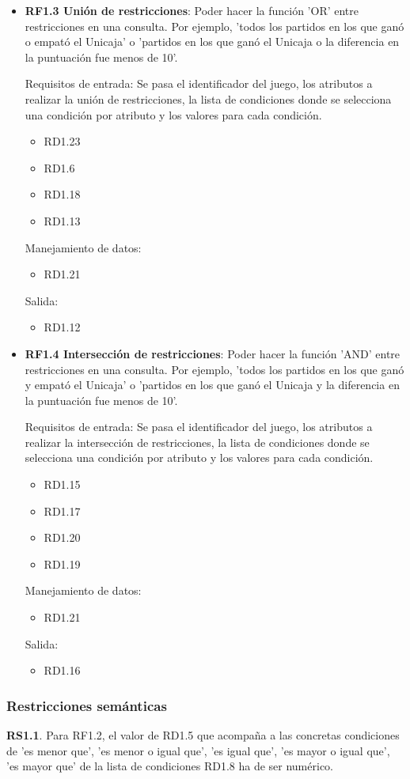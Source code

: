 \begin{itemize}
	
	\item \textbf{RF1.3 Unión de restricciones}: Poder hacer la función 'OR' entre restricciones en una consulta. Por ejemplo, 'todos los partidos en los que ganó o empató el Unicaja' o 'partidos en los que ganó el Unicaja o la diferencia en la puntuación fue menos de 10'.
	
	Requisitos de entrada: Se pasa el identificador del juego, los atributos a realizar la unión de restricciones, la lista de condiciones donde se selecciona una condición por atributo y los valores para cada condición.
	\begin{itemize}
		\item RD1.23
		\item RD1.6
		\item RD1.18
		\item RD1.13
	\end{itemize}
	Manejamiento de datos: 
	\begin{itemize}
		\item RD1.21
	\end{itemize}
	Salida:
	\begin{itemize}
		\item RD1.12
	\end{itemize}
	
	
	\item \textbf{RF1.4 Intersección de restricciones}: Poder hacer la función 'AND' entre restricciones en una consulta. Por ejemplo, 'todos los partidos en los que ganó y empató el Unicaja' o 'partidos en los que ganó el Unicaja y la diferencia en la puntuación fue menos de 10'.
	
	Requisitos de entrada: Se pasa el identificador del juego, los atributos a realizar la intersección de restricciones, la lista de condiciones donde se selecciona una condición por atributo y los valores para cada condición.
	\begin{itemize}
		\item RD1.15
		\item RD1.17
		\item RD1.20
		\item RD1.19
	\end{itemize}
	Manejamiento de datos: 
	\begin{itemize}
		\item RD1.21
	\end{itemize}
	Salida:
	\begin{itemize}
		\item RD1.16
	\end{itemize}
\end{itemize}




\subsubsection{Restricciones semánticas}

\textbf{RS1.1}. Para RF1.2, el valor de RD1.5 que acompaña a las concretas condiciones de 'es menor que', 'es menor o igual que', 'es igual que', 'es mayor o igual que', 'es mayor que' de la lista de condiciones RD1.8 ha de ser numérico.